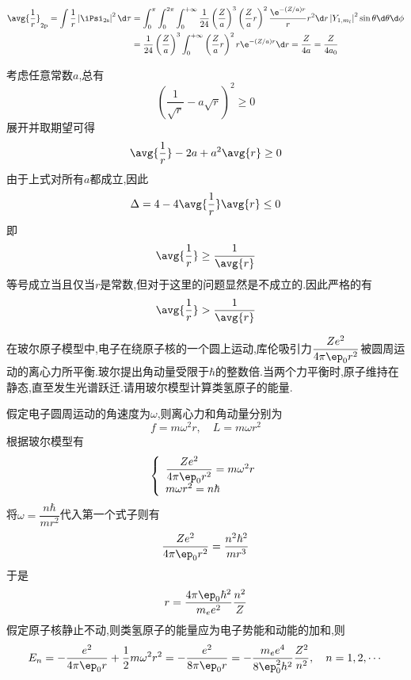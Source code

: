 \documentclass{ctexart}
\begin{document}
\begin{solution}
\begin{enumerate}[label=\tbf{(\alph*)}]
    \[\begin{aligned}
        \avg{\dfrac1r}_{2\text{p}}=\int\dfrac{1}{r}\left|\iPsi_{2\text{s}}\right|^2\d\tau
        &=\int_0^\pi\int_0^{2\pi}\int_0^{+\infty}\dfrac{1}{24}\left(\dfrac{Z}{a}\right)^3\left(\dfrac{Z}{a}r\right)^2\dfrac{\e^{-(Z/a)r}}{r}r^2\d r\left|Y_{1,m_l}\right|^2\sin\theta\d\theta\d\phi\\
        &=\dfrac{1}{24}\left(\dfrac{Z}{a}\right)^3\int_0^{+\infty}\left(\dfrac{Z}{a}r\right)^2r\e^{-(Z/a)r}\d r=\dfrac{Z}{4a}=\dfrac{Z}{4a_0}
    \end{aligned}\]
\end{enumerate}
考虑任意常数$a$,总有
\[\left(\dfrac{1}{\sqrt{r}}-a\sqrt{r}\right)^2\geq0\]
展开并取期望可得
\[\avg{\dfrac1r}-2a+a^2\avg{r}\geq0\]
由于上式对所有$a$都成立,因此
\[\Delta=4-4\avg{\dfrac1r}\avg{r}\leq0\]
即
\[\avg{\dfrac1r}\geq\dfrac{1}{\avg{r}}\]
等号成立当且仅当$r$是常数,但对于这里的问题显然是不成立的.因此严格的有
\[\avg{\dfrac1r}>\dfrac{1}{\avg{r}}\]
\end{solution}
\begin{homework}[4.]
    在玻尔原子模型中,电子在绕原子核的一个圆上运动,库伦吸引力$\dfrac{Ze^2}{4\pi\ep_0 r^2}$被圆周运动的离心力所平衡.玻尔提出角动量受限于$\hbar$的整数倍.当两个力平衡时,原子维持在静态,直至发生光谱跃迁.请用玻尔模型计算类氢原子的能量.
\end{homework}
\begin{solution}
    假定电子圆周运动的角速度为$\omega$,则离心力和角动量分别为
    \[f=m\omega^2 r,\quad L=m\omega r^2\]
    根据玻尔模型有
    \[\left\{\begin{array}{l}
        \dfrac{Ze^2}{4\pi\ep_0 r^2}=m\omega^2r\\
        m\omega r^2=n\hbar
    \end{array}\right.\]
    将$\omega=\dfrac{n\hbar}{mr^2}$代入第一个式子则有
    \[\dfrac{Ze^2}{4\pi\ep_0 r^2}=\dfrac{n^2\hbar^2}{mr^3}\]
    于是
    \[r=\dfrac{4\pi\ep_0\hbar^2}{m_ee^2}\dfrac{n^2}{Z}\]
    假定原子核静止不动,则类氢原子的能量应为电子势能和动能的加和,则
    \[E_n=-\dfrac{e^2}{4\pi\ep_0 r}+\dfrac{1}{2}m\omega^2r^2=-\dfrac{e^2}{8\pi\ep_0r}=-\dfrac{m_ee^4}{8\ep_0^2h^2}\dfrac{Z^2}{n^2},\quad n=1,2,\cdots\]
\end{solution}
\end{document}
